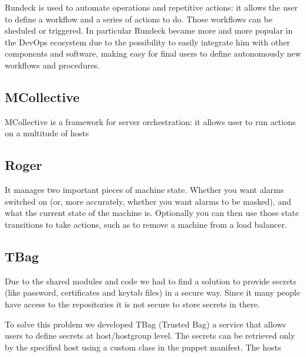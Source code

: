 Rundeck is used to automate operations and repetitive actions: it allows
the user to define a workflow and a series of actions to do. Those
workflows can be sheduled or triggered. In particular Rundeck became more
and more popular in the DevOps ecosystem due to the possibility to easily
integrate him with other components and software, making easy for final
users to define autonomously new workflows and procedures.

\subsection{MCollective}

MCollective is a framework for server orchestration: it allows user to run
actions on a multitude of hosts 

\subsection{Roger}

It manages two important pieces of machine state. Whether you want alarms
switched on (or, more accurately, whether you want alarms to be masked),
and what the current state of the machine is. Optionally you can then use
those state transitions to take actions, such as to remove a machine
from a load balancer.

\subsection{TBag}

Due to the shared modules and code we had to find a solution to provide
secrets (like password, certificates and keytab files) in a secure way.
Since it many people have access to the repositories it is not secure to
store secrets in there.

To solve this problem we developed TBag (Trusted Bag) a service that
allows users to define secrets at host/hostgroup level. The secrets can be
retrieved only by the specified host using a custom class in the puppet
manifest. The hosts

